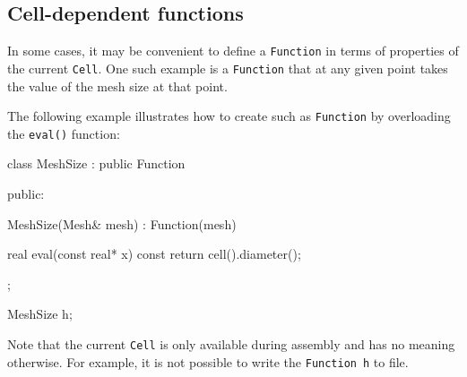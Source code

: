 
\subsection{Cell-dependent functions}

In some cases, it may be convenient to define a \texttt{Function} in
terms of properties of the current \texttt{Cell}. One such example is
a \texttt{Function} that at any given point takes the value of the
mesh size at that point.

The following example illustrates how to create such as
\texttt{Function} by overloading the \texttt{eval()} function:
\begin{code}
class MeshSize : public Function
{
public:

  MeshSize(Mesh& mesh) : Function(mesh) {}

  real eval(const real* x) const
  {
    return cell().diameter();
  }
    
};

MeshSize h;
\end{code}

Note that the current \texttt{Cell} is only available during assembly
and has no meaning otherwise. For example, it is not possible to write the
\texttt{Function}~\texttt{h} to file.


